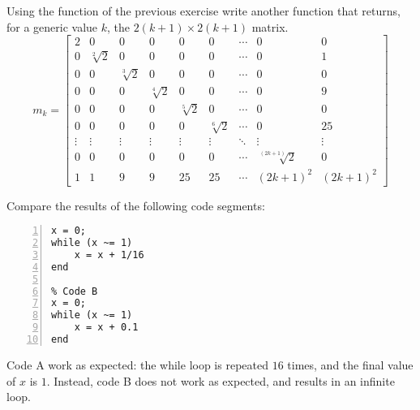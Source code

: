 \documentclass[12pt, a4paper]{report}
\newtheorem[style=M,bodystyle=\normalfont]{theorem}{Theorem}
\newtheorem[style=M,bodystyle=\normalfont]{corollary}{Corollary}
\newtheorem[style=M,bodystyle=\normalfont]{lemma}{Lemma}
\newtheorem[style=M,bodystyle=\normalfont]{definition}{Definition}
\begin{document}
    \begin{Exercise}[label=3]
        Using the function of the previous exercise write another function that returns, for a generic value $k$, the $2(k + 1) \times 2(k + 1)$ matrix.
        \[
            m_k=
            \begin{bmatrix}
                2 & 0 & 0 & 0 & 0 & 0 & \cdots & 0 & 0 \\
                0 & \sqrt[2]{2} & 0 & 0 & 0 & 0 & \cdots & 0 & 1 \\
                0 & 0 & \sqrt[3]{2} & 0 & 0 & 0 & \cdots & 0 & 0 \\
                0 & 0 & 0 & \sqrt[4]{2} & 0 & 0 & \cdots & 0 & 9 \\
                0 & 0 & 0 & 0 & \sqrt[5]{2} & 0 & \cdots & 0 & 0 \\
                0 & 0 & 0 & 0 & 0 & \sqrt[6]{2} & \cdots & 0 & 25 \\
                \vdots  & \vdots  & \vdots  & \vdots  & \vdots  & \vdots  & \ddots & \vdots  & \vdots  \\
                0 & 0 & 0 & 0 & 0 & 0 & \cdots & \sqrt[(2k+1)]{2} & 0 \\
                1 & 1 & 9 & 9 & 25 & 25 & \cdots & (2k+1)^2 & (2k+1)^2 
            \end{bmatrix} 
        \]
    \end{Exercise}
    \begin{Answer}[ref=3]

    \end{Answer}

    \newpage

    \begin{Exercise}[label=4]
        Compare the results of the following code segments:
        \begin{lstlisting}[frame=single, numbers=left, style=Matlab-bw]
% Code A
x = 0;
while (x ~= 1)
    x = x + 1/16
end

% Code B
x = 0;
while (x ~= 1)
    x = x + 0.1
end
        \end{lstlisting}
    \end{Exercise}
    \begin{Answer}[ref=4]
        Code A work as expected: the while loop is repeated $16$ times, and the final value of $x$ is $1$. Instead, code B does not work as expected, and results in an infinite loop.
    \end{Answer}
    
    \newpage
\end{document}
